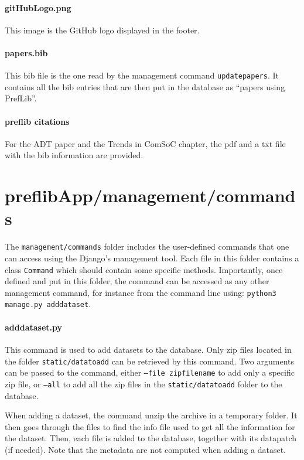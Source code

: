 \documentclass{report}
\begin{document}
	\paragraph*{\faFileO{} gitHubLogo.png} This image is the GitHub logo displayed in the footer.
	
	\paragraph*{\faFileO{} papers.bib} This bib file is the one read by the management command \texttt{updatepapers}. It contains all the bib entries that are then put in the database as ``papers using PrefLib''.
	
	\paragraph*{\faFilesO{} preflib citations} For the ADT paper and the Trends in ComSoC chapter, the pdf and a txt file with the bib information are provided.
	
	\section*{\faFolderO{} preflibApp/management/commands}
	
	The \texttt{management/commands} folder includes the user-defined commands that one can access using the Django's management tool. Each file in this folder contains a class \texttt{Command} which should contain some specific methods. Importantly, once defined and put in this folder, the command can be accessed as any other management command, for instance from the command line using: \texttt{python3 manage.py adddataset}.
	
	\paragraph*{\faFileO{} adddataset.py} This command is used to add datasets to the database. Only zip files located in the folder \texttt{static/datatoadd} can be retrieved by this command. Two arguments can be passed to the command, either \texttt{--file zipfilename} to add only a specific zip file, or \texttt{--all} to add all the zip files in the \texttt{static/datatoadd} folder to the database.
	
	When adding a dataset, the command unzip the archive in a temporary folder. It then goes through the files to find the info file used to get all the information for the dataset. Then, each file is added to the database, together with its datapatch (if needed). Note that the metadata are not computed when adding a dataset. 
	
\end{document}
